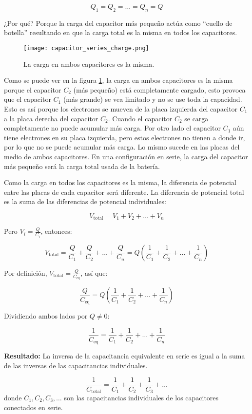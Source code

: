 \[
Q_1 = Q_2 = \dots = Q_n = Q
\]

¿Por qué? Porque la carga del capacitor más pequeño actúa como ``cuello de botella'' resultando en que la carga total es la misma en todos los capacitores.
\begin{figure}[ht]
    \centering
    \texttt{[image: capacitor\_series\_charge.png]}
    \caption{La carga en ambos capacitores es la misma.}
    \label{fig:capacitors_series_charge}
\end{figure}

Como se puede ver en la figura \ref{fig:capacitors_series_charge}, la carga en ambos capacitores es la misma porque el capacitor \(C_2\) (más pequeño) está completamente cargado, esto provoca que el capacitor \(C_1\) (más grande) se vea limitado y no se use toda la capacidad. Esto es así porque los electrones se mueven de la placa izquierda del capacitor \(C_1\) a la placa derecha del capacitor \(C_2\). Cuando el capacitor \(C_2\) se carga completamente no puede acumular más carga. Por otro lado el capacitor \(C_1\) aún tiene electrones en su placa izquierda, pero estos electrones no tienen a donde ir, por lo que no se puede acumular más carga. Lo mismo sucede en las placas del medio de ambos capacitores. En una configuración en serie, la carga del capacitor más pequeño será la carga total usada de la batería.

Como la carga en todos los capacitores es la misma, la diferencia de potencial entre las placas de cada capacitor será diferente. La diferencia de potencial total es la suma de las diferencias de potencial individuales:

\[
V_{\text{total}} = V_1 + V_2 + \dots + V_n
\]

Pero \( V_i = \frac{Q}{C_i} \), entonces:

\[
V_{\text{total}} = \frac{Q}{C_1} + \frac{Q}{C_2} + \dots + \frac{Q}{C_n} = Q \left( \frac{1}{C_1} + \frac{1}{C_2} + \dots + \frac{1}{C_n} \right)
\]

Por definición, \( V_{\text{total}} = \frac{Q}{C_{\text{eq}}} \), así que:

\[
\frac{Q}{C_{\text{eq}}} = Q \left( \frac{1}{C_1} + \frac{1}{C_2} + \dots + \frac{1}{C_n} \right)
\]

Dividiendo ambos lados por \( Q \neq 0 \):

\[
\frac{1}{C_{\text{eq}}} = \frac{1}{C_1} + \frac{1}{C_2} + \dots + \frac{1}{C_n}
\]

\textbf{Resultado:} La inversa de la capacitancia equivalente en serie es igual a la suma de las inversas de las capacitancias individuales.

\begin{equation}
    \boxed{\frac{1}{C_{\text{total}}} = \frac{1}{C_1} + \frac{1}{C_2} + \frac{1}{C_3} + \ldots}
    \label{eq:capacitance_series}
\end{equation}
donde \( C_1, C_2, C_3, \ldots \) son las capacitancias individuales de los capacitores conectados en serie.